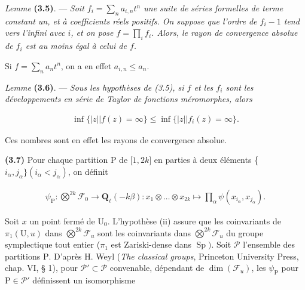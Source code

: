 \documentclass[10pt,leqno]{article}
\begin{document}
\noindent \emph{Lemme} \textbf{(3.5)}. — {\itshape Soit \(f_{i}=\sum _{n} a_{i,n}t^{n}\) une suite de séries formelles de terme constant un, et à coefficients réels positifs. On suppose que l’ordre de \(f_{i}- 1\) tend vers l’infini avec \(i\), et on pose \(f=\prod _{i} f_{i}\). Alors, le rayon de convergence absolue de \(f_{i}\) est au moins égal à celui de \(f\).}\par

\noindent Si \(f=\sum _{n} a_{n} t^{n}\), on a en effet \(a_{i,n}\leq a_{n}\).\par

\noindent \emph{Lemme} \textbf{(3.6)}. — {\itshape Sous les hypothèses de (3.5), si \(f\) et les \(f_{i}\) sont les développements en série de Taylor de fonctions méromorphes, alors}\par

\begin{equation*}\begin{gathered}\operatorname{inf}\{|z| | f(z)=\infty \} \leq  \operatorname{inf}\{|z| | f_{i}(z)=\infty \}.\end{gathered}\end{equation*}

\noindent Ces nombres sont en effet les rayons de convergence absolue.\par

\clearpage

\label{physical-14}

\noindent \textbf{(3.7)} Pour chaque partition \(\mathrm{P}\) de [\(1,2k]\) en parties à deux éléments \{\(i_{\alpha },j_{\alpha }\} (i_{\alpha }<j_{\alpha })\), on définit\par

\begin{equation*}\begin{gathered}\psi _{\mathrm{P}} : \bigotimes\limits^{2k}\mathcal{F} _{0} \longrightarrow  \mathbf{Q}_{\ell }(- k\beta ) : x_{1}\otimes \ldots \otimes x_{2k} \longmapsto  \prod _{\alpha } \psi (x_{i_{\alpha }},x_{j_{\alpha }}).\end{gathered}\end{equation*}

\noindent Soit \(x\) un point fermé de \(\mathrm{U}_{0}\). L’hypothèse (ii) assure que les coinvariants de \(\pi _{1}(\mathrm{U},u)\) dans \(\bigotimes\limits^{2k}\mathcal{F} _{u}\) sont les coinvariants dans \(\bigotimes\limits^{2k}\mathcal{F} _{u}\) du groupe symplectique tout entier (\(\pi _{1}\) est Zariski-dense dans \(\operatorname{Sp})\). Soit \(\mathcal{P} \) l’ensemble des partitions \(\mathrm{P}\). D’après \(\mathrm{H}\). Weyl (\emph{The classical groups}, Princeton University Press, chap. VI, § 1), pour \(\mathcal{P} '\subset \mathcal{P} \) convenable, dépendant de \(\operatorname{dim}(\mathcal{F} _{u})\), les \(\psi _{\mathrm{P}}\) pour \(\mathrm{P}\in \mathcal{P} '\) définissent un isomorphisme\par
\end{document}
